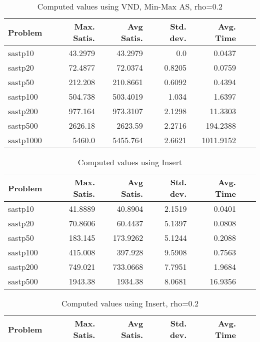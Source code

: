 \documentclass{article}
\begin{document}
\begin{table}[b!]
  \vspace{-6mm}%
  \caption{Computed values using VND, Min-Max AS, rho=0.2}
  \label{tab:conf8}
  \setlength{\tabcolsep}{1.4mm}
  \centering
  \begin{tabular}{lrrrrrr}
    \bfseries Problem &
    \bfseries Max. Satis. &
    \bfseries Avg Satis. &
    \bfseries Std. dev. &
    \bfseries Avg. Time 
    \\\hline
  sastp10 & 43.2979 & 43.2979 & 0.0 & 0.0437 \\ 
  sastp20 & 72.4877 & 72.0374 & 0.8205 & 0.0759 \\ 
  sastp50 & 212.208 & 210.8661 & 0.6092 & 0.4394 \\ 
  sastp100 & 504.738 & 503.4019 & 1.034 & 1.6397 \\ 
  sastp200 & 977.164 & 973.3107 & 2.1298 & 11.3303 \\ 
  sastp500 & 2626.18 & 2623.59 & 2.2716 & 194.2388 \\ 
  sastp1000 & 5460.0 & 5455.764 & 2.6621 & 1011.9152
    \\\hline
  \end{tabular}

\end{table}

\begin{table}[b!]
  \vspace{-6mm}%
  \caption{Computed values using Insert}
  \label{tab:conf9}
  \setlength{\tabcolsep}{1.4mm}
  \centering
  \begin{tabular}{lrrrrrr}
    \bfseries Problem &
    \bfseries Max. Satis. &
    \bfseries Avg Satis. &
    \bfseries Std. dev. &
    \bfseries Avg. Time 
    \\\hline
    sastp10 & 41.8889 & 40.8904 & 2.1519 & 0.0401 \\ 
    sastp20 & 70.8606 & 60.4437 & 5.1397 & 0.0808 \\ 
    sastp50 & 183.145 & 173.9262 & 5.1244 & 0.2088 \\ 
    sastp100 & 415.008 & 397.928 & 9.5908 & 0.7563 \\ 
    sastp200 & 749.021 & 733.0668 & 7.7951 & 1.9684 \\ 
    sastp500 & 1943.38 & 1934.38 & 8.0681 & 16.9356
    \\\hline
  \end{tabular}

\end{table}


\begin{table}
  \vspace{-6mm}%
  \caption{Computed values using Insert, rho=0.2}
  \label{tab:conf10}
  \setlength{\tabcolsep}{1.4mm}
  \centering
  \begin{tabular}{lrrrrrr}
    \bfseries Problem &
    \bfseries Max. Satis. &
    \bfseries Avg Satis. &
    \bfseries Std. dev. &
    \bfseries Avg. Time 
    \\\hline
    
    \hline
  \end{tabular}

\end{table}
\end{document}
